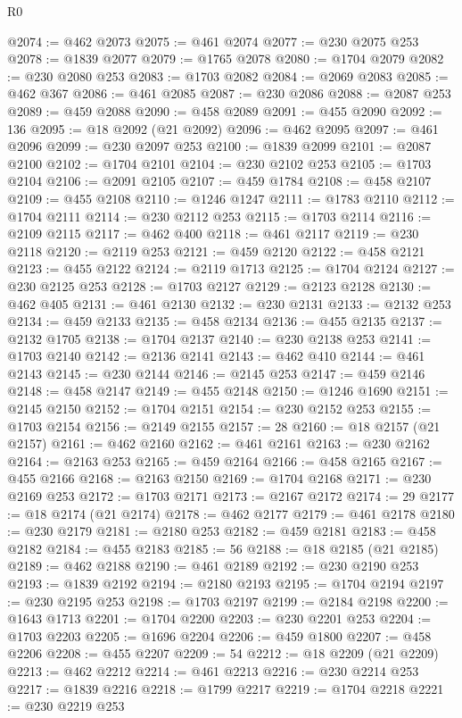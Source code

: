 \begin{lexlean}{R0}
\begin{coremodule}
@2074 := @462 @2073
@2075 := @461 @2074
@2077 := @230 @2075 @253
@2078 := @1839 @2077
@2079 := @1765 @2078
@2080 := @1704 @2079
@2082 := @230 @2080 @253
@2083 := @1703 @2082
@2084 := @2069 @2083
@2085 := @462 @367
@2086 := @461 @2085
@2087 := @230 @2086
@2088 := @2087 @253
@2089 := @459 @2088
@2090 := @458 @2089
@2091 := @455 @2090
@2092 := 136
@2095 := @18 @2092 (@21 @2092)
@2096 := @462 @2095
@2097 := @461 @2096
@2099 := @230 @2097 @253
@2100 := @1839 @2099
@2101 := @2087 @2100
@2102 := @1704 @2101
@2104 := @230 @2102 @253
@2105 := @1703 @2104
@2106 := @2091 @2105
@2107 := @459 @1784
@2108 := @458 @2107
@2109 := @455 @2108
@2110 := @1246 @1247
@2111 := @1783 @2110
@2112 := @1704 @2111
@2114 := @230 @2112 @253
@2115 := @1703 @2114
@2116 := @2109 @2115
@2117 := @462 @400
@2118 := @461 @2117
@2119 := @230 @2118
@2120 := @2119 @253
@2121 := @459 @2120
@2122 := @458 @2121
@2123 := @455 @2122
@2124 := @2119 @1713
@2125 := @1704 @2124
@2127 := @230 @2125 @253
@2128 := @1703 @2127
@2129 := @2123 @2128
@2130 := @462 @405
@2131 := @461 @2130
@2132 := @230 @2131
@2133 := @2132 @253
@2134 := @459 @2133
@2135 := @458 @2134
@2136 := @455 @2135
@2137 := @2132 @1705
@2138 := @1704 @2137
@2140 := @230 @2138 @253
@2141 := @1703 @2140
@2142 := @2136 @2141
@2143 := @462 @410
@2144 := @461 @2143
@2145 := @230 @2144
@2146 := @2145 @253
@2147 := @459 @2146
@2148 := @458 @2147
@2149 := @455 @2148
@2150 := @1246 @1690
@2151 := @2145 @2150
@2152 := @1704 @2151
@2154 := @230 @2152 @253
@2155 := @1703 @2154
@2156 := @2149 @2155
@2157 := 28
@2160 := @18 @2157 (@21 @2157)
@2161 := @462 @2160
@2162 := @461 @2161
@2163 := @230 @2162
@2164 := @2163 @253
@2165 := @459 @2164
@2166 := @458 @2165
@2167 := @455 @2166
@2168 := @2163 @2150
@2169 := @1704 @2168
@2171 := @230 @2169 @253
@2172 := @1703 @2171
@2173 := @2167 @2172
@2174 := 29
@2177 := @18 @2174 (@21 @2174)
@2178 := @462 @2177
@2179 := @461 @2178
@2180 := @230 @2179
@2181 := @2180 @253
@2182 := @459 @2181
@2183 := @458 @2182
@2184 := @455 @2183
@2185 := 56
@2188 := @18 @2185 (@21 @2185)
@2189 := @462 @2188
@2190 := @461 @2189
@2192 := @230 @2190 @253
@2193 := @1839 @2192
@2194 := @2180 @2193
@2195 := @1704 @2194
@2197 := @230 @2195 @253
@2198 := @1703 @2197
@2199 := @2184 @2198
@2200 := @1643 @1713
@2201 := @1704 @2200
@2203 := @230 @2201 @253
@2204 := @1703 @2203
@2205 := @1696 @2204
@2206 := @459 @1800
@2207 := @458 @2206
@2208 := @455 @2207
@2209 := 54
@2212 := @18 @2209 (@21 @2209)
@2213 := @462 @2212
@2214 := @461 @2213
@2216 := @230 @2214 @253
@2217 := @1839 @2216
@2218 := @1799 @2217
@2219 := @1704 @2218
@2221 := @230 @2219 @253

\end{coremodule}
\end{lexlean}
